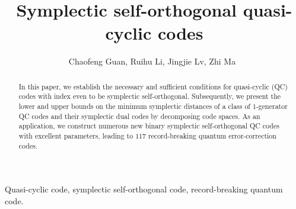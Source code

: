 \documentclass[journal]{IEEEtran}
\begin{document}
\title{Symplectic self-orthogonal quasi-cyclic codes}

\author{Chaofeng Guan, Ruihu Li, Jingjie Lv, Zhi Ma~\IEEEmembership{}
}
\markboth{}%
{}

\IEEEpubid{}

\maketitle

\begin{abstract}
In this paper, we establish the necessary and sufficient conditions for quasi-cyclic (QC) codes with index even to be symplectic self-orthogonal. Subsequently, we present the 
lower and upper bounds on the minimum symplectic distances of a class of $1$-generator QC codes and their symplectic dual codes by decomposing code spaces.
As an application, we construct numerous new binary symplectic self-orthogonal QC codes with excellent parameters, leading to $117$ record-breaking quantum error-correction codes. 
\end{abstract}

\begin{IEEEkeywords}
Quasi-cyclic code, symplectic self-orthogonal code, record-breaking quantum code.
\end{IEEEkeywords}
\end{document}
